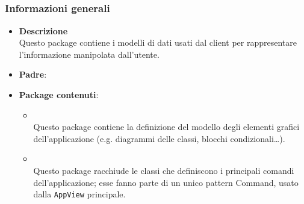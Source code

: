\subsection{}
\label{\nogloxy{swedesigner::client::model}}
\subsubsection{Informazioni generali}
\begin{itemize}
\item \textbf{Descrizione}\\
Questo package contiene i modelli di dati usati dal client per rappresentare l'informazione manipolata dall'utente.
\item \textbf{Padre}: \hyperref[\nogloxy{swedesigner::client}]{}
\item \textbf{Package contenuti}:
\begin{itemize}
\item \hyperref[\nogloxy{swedesigner::client::model::celltypes}]{}\\
Questo package contiene la definizione del modello degli elementi grafici dell'applicazione (e.g. diagrammi delle classi, blocchi condizionali\dots). 
\item \hyperref[\nogloxy{swedesigner::client::model::utility}]{}\\
Questo package racchiude le classi che definiscono i principali comandi dell'applicazione; esse fanno parte di un unico pattern Command, usato dalla \texttt{AppView} principale.
\end{itemize}
\end{itemize}
